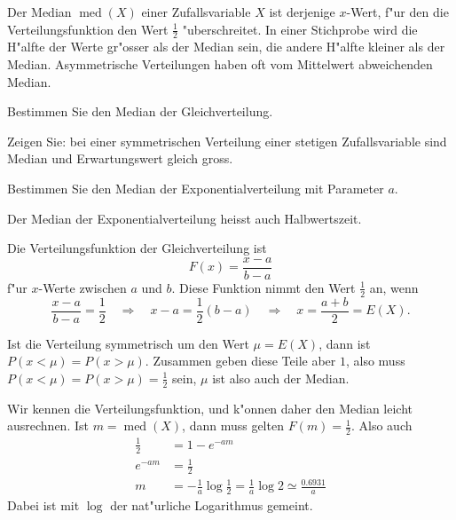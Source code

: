 Der Median $\operatorname{med}(X)$ einer Zufallsvariable $X$
ist derjenige $x$-Wert, f"ur den die
Verteilungsfunktion den Wert $\frac12$ "uberschreitet. In einer
Stichprobe wird die H"alfte der Werte gr"osser als der Median
sein, die andere H"alfte kleiner als der Median. Asymmetrische
Verteilungen haben oft vom Mittelwert abweichenden Median.

\begin{teilaufgaben}
\item Bestimmen Sie den Median der Gleichverteilung.
\item Zeigen Sie: bei einer symmetrischen Verteilung einer
stetigen Zufallsvariable sind Median
und Erwartungswert gleich gross.
\item Bestimmen Sie den Median der Exponentialverteilung mit Parameter $a$.
\end{teilaufgaben}
Der Median der Exponentialverteilung heisst auch Halbwertszeit.

\begin{loesung}
\begin{teilaufgaben}
\item Die Verteilungsfunktion der Gleichverteilung ist
\[
F(x)=\frac{x-a}{b-a}
\]
f"ur $x$-Werte zwischen $a$ und $b$. Diese Funktion nimmt den
Wert $\frac12$ an, wenn
\[
\frac{x-a}{b-a}=\frac12
\quad\Rightarrow\quad
x-a=\frac12(b-a)
\quad\Rightarrow\quad
x=\frac{a+b}2=E(X).
\]
\item Ist die Verteilung symmetrisch um den Wert $\mu=E(X)$, dann
ist $P(x<\mu)=P(x>\mu)$. Zusammen geben diese Teile aber $1$, also
muss $P(x<\mu)=P(x>\mu)=\frac12$ sein, $\mu$ ist also auch der Median.
\item
Wir kennen die Verteilungsfunktion, und k"onnen daher den Median
leicht ausrechnen. Ist $m=\operatorname{med}(X)$, dann muss
gelten $F(m)=\frac12$. Also auch
\begin{align*}
\frac12&=1-e^{-am}\\
e^{-am}&=\frac12\\
m&=-\frac1a\log\frac12=\frac1a\log 2\simeq\frac{0.6931}{a}
\end{align*}
Dabei ist mit $\log$ der nat"urliche Logarithmus gemeint.
\qedhere
\end{teilaufgaben}
\end{loesung}

